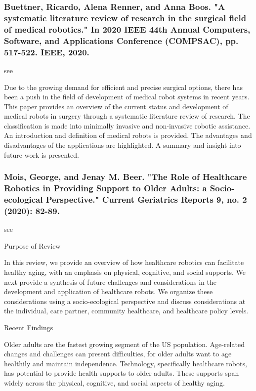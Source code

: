 \documentclass[conference]{IEEEtran}
\begin{document}
\medskip
\subsubsection{Buettner, Ricardo, Alena Renner, and Anna Boos. "A systematic literature review of research in the surgical field of medical robotics." In 2020 IEEE 44th Annual Computers, Software, and Applications Conference (COMPSAC), pp. 517-522. IEEE, 2020.}
see \cite{buettner2020systematic}

Due to the growing demand for efficient and precise surgical options, there has been a push in the field of development of medical robot systems in recent years. This paper provides an overview of the current status and development of medical robots in surgery through a systematic literature review of research. The classification is made into minimally invasive and non-invasive robotic assistance. An introduction and definition of medical robots is provided. The advantages and disadvantages of the applications are highlighted. A summary and insight into future work is presented.

\medskip
\subsubsection{Mois, George, and Jenay M. Beer. "The Role of Healthcare Robotics in Providing Support to Older Adults: a Socio-ecological Perspective." Current Geriatrics Reports 9, no. 2 (2020): 82-89.}
see \cite{mois2020role}

Purpose of Review

In this review, we provide an overview of how healthcare robotics can facilitate healthy aging, with an emphasis on physical, cognitive, and social supports. We next provide a synthesis of future challenges and considerations in the development and application of healthcare robots. We organize these considerations using a socio-ecological perspective and discuss considerations at the individual, care partner, community healthcare, and healthcare policy levels.

Recent Findings

Older adults are the fastest growing segment of the US population. Age-related changes and challenges can present difficulties, for older adults want to age healthily and maintain independence. Technology, specifically healthcare robots, has potential to provide health supports to older adults. These supports span widely across the physical, cognitive, and social aspects of healthy aging.
\end{document}
